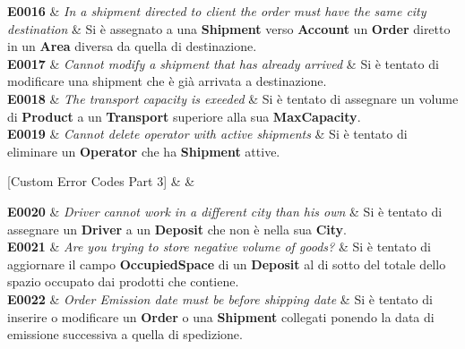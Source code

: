 {  \textbf{E0016} &
  {\footnotesize
    \textit{In a shipment directed to client the order must have the same city destination}
  } &
  {\footnotesize
    Si è assegnato a una \textbf{Shipment} verso \textbf{Account} un \textbf{Order} diretto in un \textbf{Area} diversa da quella di destinazione.} \\

  \textbf{E0017} &
  {\footnotesize
    \textit{Cannot modify a shipment that has already arrived} } &
  {\footnotesize
    Si è tentato di modificare una shipment che è già arrivata a destinazione.} \\

  \textbf{E0018} &
  {\footnotesize
    \textit{The transport capacity is exeeded} } &
  {\footnotesize
    Si è tentato di assegnare un volume di \textbf{Product} a un \textbf{Transport} superiore alla sua \textbf{MaxCapacity}.} \\

  \textbf{E0019} &
  {\footnotesize
    \textit{Cannot delete operator with active shipments} } &
  {\footnotesize
    Si è tentato di eliminare un \textbf{Operator} che ha \textbf{Shipment} attive.} \\

}

[Custom Error Codes Part 3]{ &  & }{

\textbf{E0020} &
{\footnotesize
  \textit{Driver cannot work in a different city than his own} } &
{\footnotesize
  Si è tentato di assegnare un \textbf{Driver} a un \textbf{Deposit} che non è nella sua \textbf{City}.} \\

\textbf{E0021} &
{\footnotesize
  \textit{Are you trying to store negative volume of goods?} } &
{\footnotesize
  Si è tentato di aggiornare il campo \textbf{OccupiedSpace} di un \textbf{Deposit} al di sotto del totale dello spazio occupato dai prodotti che contiene.} \\

\textbf{E0022} &
  \textit{Order Emission date must be before shipping date} & 
{\footnotesize
  Si è tentato di inserire o modificare un \textbf{Order} o una \textbf{Shipment} collegati ponendo la data di emissione successiva a quella di spedizione.} \\

}

